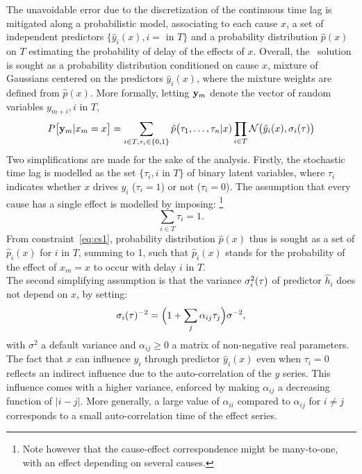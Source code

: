 The unavoidable error due to the discretization of the continuous time lag is mitigated along a probabilistic model,
associating to each cause $x$, a set of independent predictors $\{\hat y_i(x),i=$ in $T\}$ and a probability 
distribution $\hat p(x)$ on $T$ estimating the probability of delay of the effects of $x$. Overall, the \XX\ 
solution is sought as a probability distribution conditioned on cause $x$, mixture of Gaussians centered on the 
predictors $\hat y_i(x)$, where the mixture weights are defined from $\hat p(x)$. More formally, letting ${\bf y}_m$ 
denote the vector of random variables $y_{m+i}, i$ in $T$, 
\begin{equation}\label{eq:py}
  P\bigl[{\bf y}_{m}\vert x_m=x\bigr] = \sum_{i \in T, \tau_i\in\{0,1\}}  \hat p\bigl(\tau_1,\ldots,\tau_n\vert x)
\prod_{i\in T} {\cal N}\bigl(\hat y_i(x),\sigma_i(\tau)\bigr)
\end{equation}
Two simplifications are made for the sake of the analysis. Firstly, the stochastic time lag is modelled as the set 
$\{\tau_i, i$ in $ T\}$ of binary latent variables, where $\tau_i$ indicates whether $x$ drives $y_i$ ($\tau_i=1$) 
or not ($\tau_i=0$). The assumption that every cause has a single effect is modelled by imposing:
\footnote{Note however that the cause-effect correspondence might be many-to-one, with an effect depending on 
several causes.}
\begin{equation}\label{eq:cs1}
\sum_{i \in T} \tau_i = 1.
\end{equation}
From constraint~\cref{eq:cs1}, probability distribution $\hat p(x)$ thus is sought as a set of $\hat p_i(x)$ 
for $i$ in $T$, summing to 1, such that $\hat p_i(x)$ stands for the probability of the effect of $x_m=x$ to occur 
with delay $i$ in $T$. \\
The second simplifying assumption is that the variance $\sigma_i^2({\bf \tau})$ of predictor $\hat h_i$ does not 
depend on $x$, by setting:
\[
\sigma_i({\bf \tau})^{-2} = \Bigl(1+\sum_j\alpha_{ij} \tau_j\Bigr)\sigma^{-2},
\]
with $\sigma^2$ a default variance and $\alpha_{ij}\ge 0$ a matrix of non-negative real parameters. 
The fact that $x$ can influence $y_i$ through predictor $\hat y_i(x)$ even when $\tau_i=0$ reflects an indirect
influence due to the auto-correlation of the $y$ series. This influence comes with a higher variance, enforced by 
making $\alpha_{ij}$ a decreasing function of $\vert i-j\vert$. More generally, a large value of $\alpha_{ii}$ 
compared to $\alpha_{ij}$ for $i\ne j$ corresponds to a small auto-correlation time of the effect series. 


